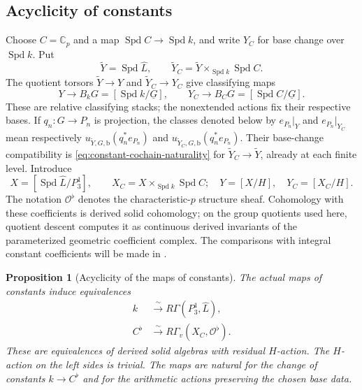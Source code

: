 \documentclass[11pt]{article}
\numberwithin{equation}{section}
\newtheorem{proposition}[theorem]{Proposition}
\theoremstyle{definition}
\theoremstyle{remark}
\newcommand{\C}{\mathbb C}
\newcommand{\cO}{\mathcal O}
\DeclareMathOperator{\Spd}{Spd}
\begin{document}
\subsection{Acyclicity of constants}

Choose $C=\C_p$ and a map $\Spd C\to\Spd k$, and write $Y_C$ for
base change over $\Spd k$.  Put
\[
 \widetilde Y=\Spd\widehat L,\qquad
 \widetilde Y_C=\widetilde Y\times_{\Spd k}\Spd C.
\]
The quotient torsors $\widetilde Y\to Y$ and $\widetilde Y_C\to Y_C$
give classifying maps
\[
 Y\longrightarrow B_kG=[\Spd k/\underline G],\qquad
 Y_C\longrightarrow B_CG=[\Spd C/\underline G].
\]
These are relative classifying stacks; the nonextended actions fix
their respective bases.  If $q_n:G\to P_n$ is projection, the classes
denoted below by $e_{P_n}|_Y$ and $e_{P_n}|_{Y_C}$ mean respectively
$u_{\widetilde Y,G,\mathrm b}(q_n^*e_{P_n})$ and
$u_{\widetilde Y_C,G,\mathrm b}(q_n^*e_{P_n})$.
Their base-change compatibility is
\eqref{eq:constant-cochain-naturality} for
$\widetilde Y_C\to\widetilde Y$, already at each finite level.  Introduce
\[
 X=[\Spd\widehat L/P_3^1],\qquad
 X_C=X\times_{\Spd k}\Spd C;
 \quad Y=[X/H],\quad Y_C=[X_C/H].
\]
The notation $\cO^{\flat}$ denotes the characteristic-$p$ structure
sheaf.  Cohomology with these coefficients is derived solid cohomology;
on the group quotients used here, quotient descent computes it as
continuous derived invariants of the parameterized geometric coefficient
complex.  The comparisons
with integral constant coefficients will be made in
.

\begin{proposition}[Acyclicity of the maps of constants]
\label{prop:constant-acyclicity}
The actual maps of constants induce equivalences
\begin{align}
 k&\xrightarrow{\ \sim\ }R\Gamma(P_3^1,\widehat L),
       \label{eq:finite-constant-map}\\
 C^{\flat}&\xrightarrow{\ \sim\ }
       R\Gamma_v(X_C,\cO^{\flat}).
       \label{eq:geometric-constant-map}
\end{align}
These are equivalences of derived solid algebras with residual $H$-action.
The $H$-action on the left sides is trivial.  The maps are natural for
the change of constants $k\to C^{\flat}$ and for the arithmetic actions
preserving the chosen base data.
\end{proposition}
\end{document}
